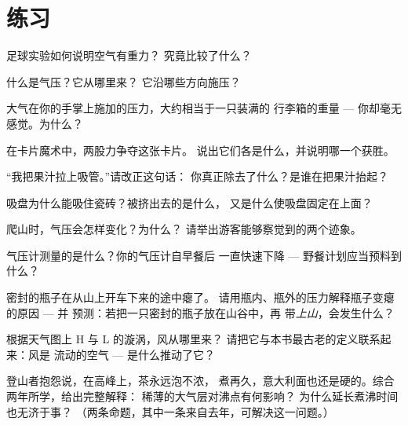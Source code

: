 \section{练习}

\begin{exercise}[$\star$]\label{exo:g5:air-pressure-weather:1}
足球实验如何说明空气有重力？
究竟比较了什么？
\end{exercise}

\begin{exercise}[$\star$]\label{exo:g5:air-pressure-weather:2}
什么是气压？它从哪里来？
它沿哪些方向施压？
\end{exercise}

\begin{exercise}[$\star$]\label{exo:g5:air-pressure-weather:3}
大气在你的手掌上施加的压力，大约相当于一只装满的
行李箱的重量 --- 你却毫无感觉。为什么？
\end{exercise}

\begin{exercise}[$\star$]\label{exo:g5:air-pressure-weather:4}
在卡片魔术中，两股力争夺这张卡片。
说出它们各是什么，并说明哪一个获胜。
\end{exercise}

\begin{exercise}[$\star$]\label{exo:g5:air-pressure-weather:5}
“我把果汁拉上吸管。”请改正这句话：
你真正除去了什么？是谁在把果汁抬起？
\end{exercise}

\begin{exercise}[$\star$]\label{exo:g5:air-pressure-weather:6}
吸盘为什么能吸住瓷砖？被挤出去的是什么，
又是什么使吸盘固定在上面？
\end{exercise}

\begin{exercise}[$\star$]\label{exo:g5:air-pressure-weather:7}
爬山时，气压会怎样变化？为什么？
请举出游客能够察觉到的两个迹象。
\end{exercise}

\begin{exercise}[$\star$]\label{exo:g5:air-pressure-weather:8}
气压计测量的是什么？你的气压计自早餐后
一直快速下降 --- 野餐计划应当预料到什么？
\end{exercise}

\begin{exercise}[$\star\star$]\label{exo:g5:air-pressure-weather:9}
密封的瓶子在从山上开车下来的途中瘪了。
请用瓶内、瓶外的压力解释瓶子变瘪的原因 --- 并
预测：若把一只密封的瓶子放在山谷中，再
带\emph{上山}，会发生什么？
\end{exercise}

\begin{exercise}[$\star\star$]\label{exo:g5:air-pressure-weather:10}
根据天气图上 H 与 L 的漩涡，风从哪里来？
请把它与本书最古老的定义联系起来：风是
流动的空气 --- 是什么推动了它？
\end{exercise}

\begin{exercise}[$\star\star$]\label{exo:g5:air-pressure-weather:11}
登山者抱怨说，在高峰上，茶永远泡不浓，
煮再久，意大利面也还是硬的。综合两年所学，给出完整解释：
稀薄的大气层对沸点有何影响？
为什么延长煮沸时间也无济于事？
（两条命题，其中一条来自去年，可解决这一问题。）
\end{exercise}
